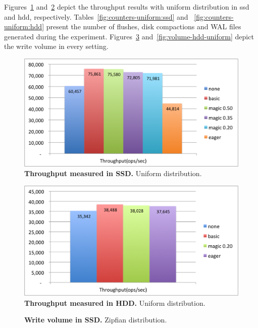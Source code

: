 {Figures~\ref{fig:throughput-ssd-uniform} and~\ref{fig:throughput-hdd-uniform} depict the throughput results with uniform distribution in ssd and hdd, respectively.
Tables~\ref{fig:counters-uniform:ssd} and ~\ref{fig:counters-uniform:hdd} present the number of flushes, disk compactions and WAL files generated during the experiment.
Figures~\ref{fig:volume-ssd-uniform} and~\ref{fig:volume-hdd-uniform} depict the write volume in every setting. 


\begin{figure}[htb]
\includegraphics[width=\figw]{Figs/throughput-ssd-uniform.png}
\caption{{\bf  Throughput measured in SSD.} Uniform distribution.
}
\label{fig:throughput-ssd-uniform}
\end{figure}

\begin{figure}[htb]
\includegraphics[width=\figw]{Figs/throughput-hdd-uniform.png}
\caption{{\bf  Throughput measured in HDD.} Uniform distribution. 
}
\label{fig:throughput-hdd-uniform}
\end{figure}

\begin{figure}[htb]
\caption{{\bf  Write volume in SSD.} Zipfian distribution.
}
\label{fig:volume-ssd-uniform}
\end{figure}

}
